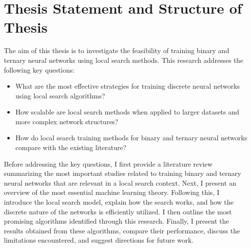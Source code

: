 \section{Thesis Statement and Structure of Thesis}
The aim of this thesis is to investigate the feasibility of training binary and ternary neural networks using local search methods. This research addresses the following key questions:

\begin{itemize}
    \item What are the most effective strategies for training discrete neural networks using local search algorithms?
    \item How scalable are local search methods when applied to larger datasets and more complex network structures? 
    \item How do local search training methods for binary and ternary neural networks compare with the existing literature?
\end{itemize}

\noindent Before addressing the key questions, I first provide a literature review summarizing the most important studies related to training binary and ternary neural networks that are relevant in a local search context. Next, I present an overview of the most essential machine learning theory. Following this, I introduce the local search model, explain how the search works, and how the discrete nature of the networks is efficiently utilized. I then outline the most promising algorithms identified through this research. Finally, I present the results obtained from these algorithms, compare their performance, discuss the limitations encountered, and suggest directions for future work. 

